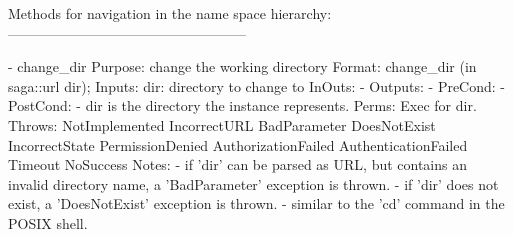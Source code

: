 \begin{myspec}
 
    Methods for navigation in the name space hierarchy:
    ---------------------------------------------------
 
    - change_dir
      Purpose:  change the working directory
      Format:   change_dir         (in  saga::url  dir);
      Inputs:   dir:                directory to change to
      InOuts:   -
      Outputs:  -
      PreCond:  -
      PostCond: - dir is the directory the instance represents.
      Perms:    Exec for dir.
      Throws:   NotImplemented
                IncorrectURL
                BadParameter
                DoesNotExist
                IncorrectState
                PermissionDenied
                AuthorizationFailed
                AuthenticationFailed
                Timeout
                NoSuccess
      Notes:    - if 'dir' can be parsed as URL, but contains an
                  invalid directory name, a 'BadParameter'
                  exception is thrown.
                - if 'dir' does not exist, a 'DoesNotExist'
                  exception is thrown.
                - similar to the 'cd' command in the POSIX 
                  shell.
 

\end{myspec}
